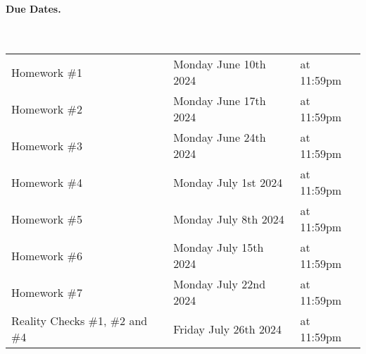 \documentclass[letterpaper,10pt]{article}
\begin{document}
\paragraph{Due Dates.}
~\\
\begin{center}
\begin{tabular}{lll}
Homework \#1 & Monday June 10th 2024 & at 11:59pm\\
Homework \#2 & Monday June 17th 2024 & at 11:59pm\\
Homework \#3 & Monday June 24th 2024 & at 11:59pm\\
Homework \#4 & Monday July  1st 2024 & at 11:59pm\\
Homework \#5 & Monday July  8th 2024 & at 11:59pm\\
Homework \#6 & Monday July 15th 2024 & at 11:59pm\\
Homework \#7 & Monday July 22nd 2024 & at 11:59pm\\
Reality Checks \#1, \#2 and \#4  & Friday July 26th 2024 & at 11:59pm\\
\end{tabular}
\end{center}
\end{document}
